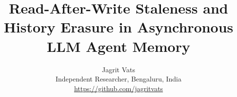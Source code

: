 \documentclass[10pt]{article}
\title{Read-After-Write Staleness and History Erasure in Asynchronous LLM Agent Memory}
\author{\name Jagrit Vats \\
\addr Independent Researcher, Bengaluru, India \\
\addr \url{https://github.com/jagritvats}}
\begin{document}
\maketitle

\begin{abstract}

\end{abstract}













\clearpage
\appendix

\end{document}
